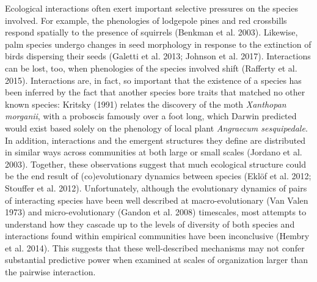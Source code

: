 \documentclass[11pt,serif]{article}
\begin{document}
\cleardoublepage

\doublespacing

\newcommand{\plusnamesingular}{}
\newcommand{\starnamesingular}{}
\newcommand{\xrefname}[1]{\protect\renewcommand{\plusnamesingular}{#1}}
\newcommand{\Xrefname}[1]{\protect\renewcommand{\starnamesingular}{#1}}
\providecommand{\cref}{\plusnamesingular~\ref}
\providecommand{\Cref}{\starnamesingular~\ref}
\providecommand{\crefformat}[2]{}
\providecommand{\Crefformat}[2]{}

\crefformat{figure}{fig.~#2#1#3}
\Crefformat{figure}{Figure~#2#1#3}
\crefformat{table}{table~#2#1#3}
\Crefformat{table}{Table~#2#1#3}
\crefformat{equation}{eq.~#2#1#3}
\Crefformat{equation}{Equation~#2#1#3}

Ecological interactions often exert important selective pressures on the
species involved. For example, the phenologies of lodgepole pines and
red crossbills respond spatially to the presence of squirrels (Benkman
et al. 2003). Likewise, palm species undergo changes in seed morphology
in response to the extinction of birds dispersing their seeds (Galetti
et al. 2013; Johnson et al. 2017). Interactions can be lost, too, when
phenologies of the species involved shift (Rafferty et al. 2015).
Interactions are, in fact, so important that the existence of a species
has been inferred by the fact that another species bore traits that
matched no other known species: Kritsky (1991) relates the discovery of
the moth \emph{Xanthopan morganii}, with a proboscis famously over a
foot long, which Darwin predicted would exist based solely on the
phenology of local plant \emph{Angraecum sesquipedale}. In addition,
interactions and the emergent structures they define are distributed in
similar ways across communities at both large or small scales (Jordano
et al. 2003). Together, these observations suggest that much ecological
structure could be the end result of (co)evolutionary dynamics between
species (Eklöf et al. 2012; Stouffer et al. 2012). Unfortunately,
although the evolutionary dynamics of pairs of interacting species have
been well described at macro-evolutionary (Van Valen 1973) and
micro-evolutionary (Gandon et al. 2008) timescales, most attempts to
understand how they cascade up to the levels of diversity of both
species and interactions found within empirical communities have been
inconclusive (Hembry et al. 2014). This suggests that these
well-described mechanisms may not confer substantial predictive power
when examined at scales of organization larger than the pairwise
interaction.
\end{document}
